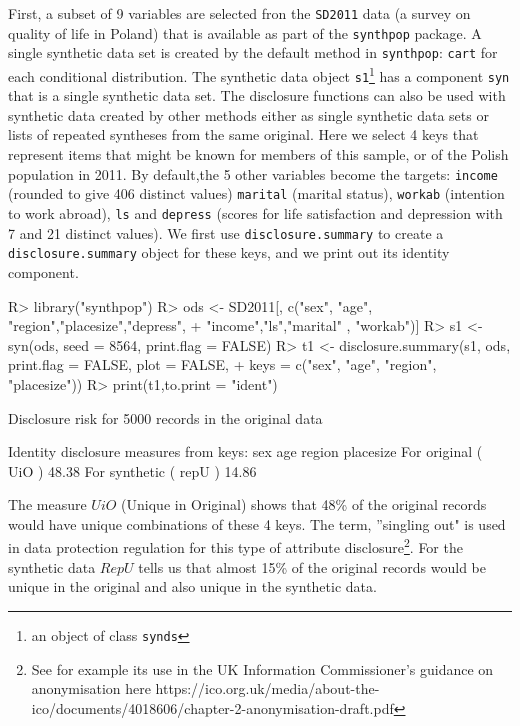 \documentclass[12pt]{article}
\renewcommand{\baselinestretch}{1.5} %
\begin{document}
First, a subset of 9 variables are selected fron the \texttt{SD2011} data (a survey on quality of life in Poland) that is available as part of the \texttt{synthpop} package. A single synthetic data set is created by the default method in \texttt{synthpop}: \texttt{cart} for each conditional distribution. The synthetic data object \texttt{s1}\footnote{an object of class \texttt{synds}} has a component \texttt{syn} that is a single synthetic data set. The disclosure functions can also be used with synthetic data created by other methods either as single synthetic data sets or lists of repeated syntheses from the same original. Here we select 4 keys that represent items that might be known
for members of this sample, or of the Polish population in 2011. By default,the 5 other variables become the targets: \texttt{income} (rounded to give 406 distinct values) \texttt{marital} (marital status), \texttt{workab} (intention to work abroad), \texttt{ls} and \texttt{depress} (scores for life satisfaction and depression with 7 and 21 distinct values).
We first use \texttt{disclosure.summary} to create a \texttt{disclosure.summary} object for these keys, and we print out its identity 
component.
\renewcommand{\baselinestretch}{1.0}
\begin{Schunk}
\begin{Sinput}
R> library("synthpop")
R> ods <- SD2011[, c("sex", "age", "region","placesize","depress",
+    "income","ls","marital" , "workab")]
R> s1 <- syn(ods, seed = 8564, print.flag = FALSE)
R> t1 <- disclosure.summary(s1, ods, print.flag = FALSE, plot = FALSE,
+     keys = c("sex", "age", "region", "placesize"))
R> print(t1,to.print = "ident")
\end{Sinput}
\begin{Soutput}
Disclosure risk for 5000 records in the original data

Identity disclosure measures
from keys: sex age region placesize 
For original  ( UiO )  48.38 %
For synthetic ( repU ) 14.86 %
\end{Soutput}
\end{Schunk}
\renewcommand{\baselinestretch}{1.5}
The measure $UiO$ (Unique in Original) shows that 48\% of the original records would have unique combinations of these 4 keys. The term, ''singling out" is used in data protection regulation for this type of attribute disclosure\footnote{See for example its use in the UK Information Commissioner's guidance on anonymisation here https://ico.org.uk/media/about-the-ico/documents/4018606/chapter-2-anonymisation-draft.pdf}. For the synthetic data $RepU$ tells us that almost 15\% of the original records would be unique in the original and also unique in the synthetic data.
\end{document}
